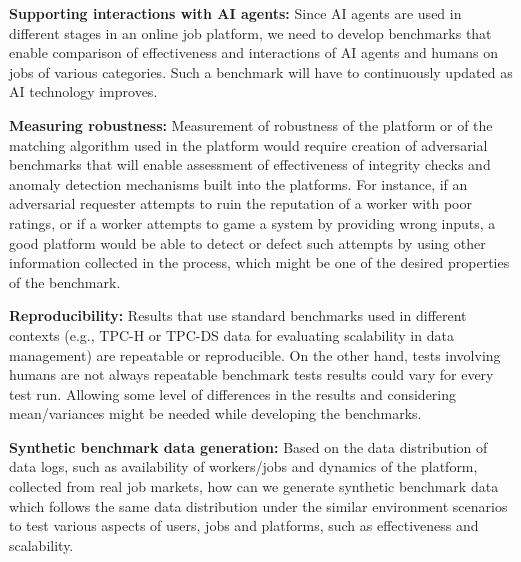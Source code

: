 \textbf{Supporting interactions with AI agents:} Since AI agents are used in different stages in an online job platform, we need to develop benchmarks that enable comparison of effectiveness and interactions of AI agents and humans on jobs of various categories. Such a benchmark will have to continuously updated as AI technology improves.

\textbf{Measuring robustness:} Measurement of robustness of the platform or of the matching algorithm used in the platform would require creation of adversarial benchmarks that will enable assessment of effectiveness of integrity checks and anomaly detection mechanisms built into the platforms. For instance, if an adversarial requester attempts to ruin the reputation of a worker with poor ratings, or if a worker attempts to game a system by providing wrong inputs, a good platform would be able to detect or defect such attempts by using other information collected in the process, which might be one of the desired properties of the benchmark.

\textbf{Reproducibility:} Results that use standard benchmarks used in different contexts (e.g., TPC-H or TPC-DS data for evaluating scalability in data management) are repeatable or reproducible. On the other hand, tests involving humans are not always repeatable benchmark tests results could vary for every test run. Allowing some level of differences in the results and considering mean/variances might be needed while developing the benchmarks.

\textbf{Synthetic benchmark data generation:} Based on the data distribution of data logs, such as availability of workers/jobs and dynamics of the platform, collected from real job markets, how can  we generate synthetic  benchmark data which follows the same data distribution under the similar environment scenarios to test various aspects of users, jobs and platforms, such as effectiveness and scalability.
